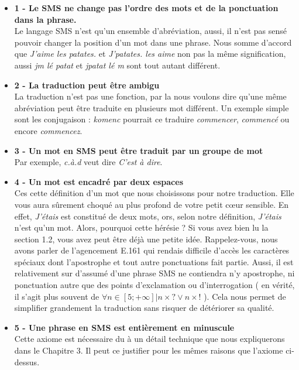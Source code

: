 \documentclass[11pt]{book}
\begin{document}
	\begin{itemize}
		\item \textbf{1 - Le SMS ne change pas l'ordre des mots et de la ponctuation dans la phrase.}\\
		Le langage SMS n'est qu'un ensemble d'abréviation, aussi, il n'est pas sensé pouvoir changer la position d'un mot dans une phrase. Nous somme d'accord que {\em J'aime les patates.} et {\em J'patates. les aime} non pas la même signification, aussi {\em jm lé patat} et {\em jpatat lé m} sont tout autant différent.\\
		
		\item \textbf{2 - La traduction peut être ambigu}\\
		La traduction n'est pas une fonction, par la nous voulons dire qu'une même abréviation peut être traduite en plusieurs mot différent. Un exemple simple sont les conjugaison : {\em komenc} pourrait ce traduire {\em commencer}, {\em commencé} ou encore {\em commencez}.\\
		
		\item \textbf{3 - Un mot en SMS peut être traduit par un groupe de mot}\\
		Par exemple, {\em c.à.d} veut dire {\em C'est à dire}.\\
		
		\item \textbf{4 - Un mot est encadré par deux espaces}\\
		Ces cette définition d'un mot que nous choisissons pour notre traduction. Elle vous aura sûrement choqué au plus profond de votre petit cœur sensible. En effet, {\em J'étais} est constitué de deux mots, ors, selon notre définition, {\em J'étais} n'est qu'un mot. Alors, pourquoi cette hérésie ? Si vous avez bien lu la section 1.2, vous avez peut être déjà une petite idée. Rappelez-vous, nous avons parler de l'agencement E.161 qui rendais difficile d'accès les caractères spéciaux dont l'apostrophe et tout autre ponctuations fait partie. Aussi, il est relativement sur d'assumé d'une phrase SMS ne contiendra n'y apostrophe, ni ponctuation autre que des points d'exclamation ou d'interrogation ( en vérité, il s'agit plus souvent de $ \forall n \in [5;+\infty] | n \times ? \vee n \times ! $ ). Cela nous permet de simplifier grandement la traduction sans risquer de détériorer sa qualité.\\
		\item \textbf{5 - Une phrase en SMS est entièrement en minuscule}\\
		Cette axiome est nécessaire du à un détail technique que nous expliquerons dans le Chapitre 3. Il peut ce justifier pour les mêmes raisons que l'axiome ci-dessus.\\
	\end{itemize}
	
\end{document}

